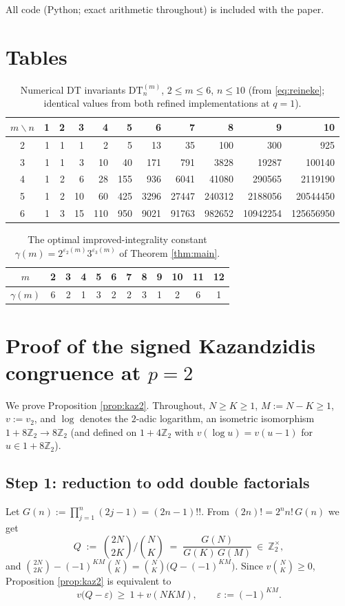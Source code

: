 \documentclass[11pt]{amsart}
\theoremstyle{definition}
\newcommand{\ZZ}{\mathbb{Z}}
\newcommand{\DT}{\mathrm{DT}}
\begin{document}
All code (Python; exact arithmetic throughout) is included with the paper.

\appendix
\section{Tables}\label{app:tables}

\begin{table}[ht]
\caption{Numerical DT invariants $\DT^{(m)}_n$, $2\le m\le 6$, $n\le 10$ (from \eqref{eq:reineke}; identical values from both refined implementations at $q=1$).}
\begin{tabular}{c|rrrrrrrrrr}
$m\backslash n$&1&2&3&4&5&6&7&8&9&10\\\hline
2& 1 & 1 & 1 & 2 & 5 & 13 & 35 & 100 & 300 & 925\\
3& 1 & 1 & 3 & 10 & 40 & 171 & 791 & 3828 & 19287 & 100140\\
4& 1 & 2 & 6 & 28 & 155 & 936 & 6041 & 41080 & 290565 & 2119190\\
5& 1 & 2 & 10 & 60 & 425 & 3296 & 27447 & 240312 & 2188056 & 20544450\\
6& 1 & 3 & 15 & 110 & 950 & 9021 & 91763 & 982652 & 10942254 & 125656950
\end{tabular}
\end{table}

\begin{table}[ht]
\caption{The optimal improved-integrality constant $\gamma(m)=2^{\varepsilon_2(m)}3^{\varepsilon_3(m)}$ of Theorem \ref{thm:main}.}
\begin{tabular}{c|ccccccccccc}
$m$&2&3&4&5&6&7&8&9&10&11&12\\\hline
$\gamma(m)$&6&2&1&3&2&2&3&1&2&6&1
\end{tabular}
\end{table}

\section{Proof of the signed Kazandzidis congruence at $p=2$}\label{app:p2}

We prove Proposition \ref{prop:kaz2}. Throughout, $N\ge K\ge 1$, $M:=N-K\ge1$, $v:=v_2$, and $\log$ denotes the $2$-adic logarithm, an isometric isomorphism $1+8\ZZ_2\to 8\ZZ_2$ (and defined on $1+4\ZZ_2$ with $v(\log u)=v(u-1)$ for $u\in1+8\ZZ_2$).

\subsection*{Step 1: reduction to odd double factorials}
Let $G(n):=\prod_{j=1}^n(2j-1)=(2n-1)!!$. From $(2n)!=2^n n!\,G(n)$ we get
\begin{equation}\label{eq:Qdef}
Q\;:=\;\binom{2N}{2K}\Big/\binom NK\;=\;\frac{G(N)}{G(K)\,G(M)}\ \in\ \ZZ_2^\times ,
\end{equation}
and $\binom{2N}{2K}-(-1)^{KM}\binom NK=\binom NK\big(Q-(-1)^{KM}\big)$. Since $v\binom NK\ge0$, Proposition \ref{prop:kaz2} is equivalent to
\begin{equation}\label{eq:goal}
v\big(Q-\varepsilon\big)\ \ge\ 1+v(NKM),\qquad \varepsilon:=(-1)^{KM}.
\end{equation}
\end{document}
